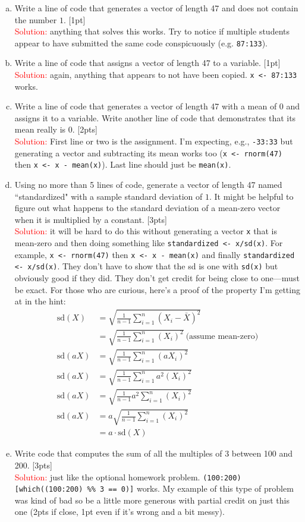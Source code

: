 \documentclass[12pt]{article}
\newcommand{\ans}{\\\textcolor{red}{Solution: }}
\begin{document}
\begin{enumerate}[(a)]
	\item Write a line of code that generates a vector of length 47 and does not contain the number $1$. [1pt] \ans anything that solves this works. Try to notice if multiple students appear to have submitted the same code conspicuously (e.g. \verb|87:133|).
	\item Write a line of code that assigns a vector of length 47 to a variable. [1pt] \ans{again, anything that appears to not have been copied. \verb|x <- 87:133| works.}
	\item Write a line of code that generates a vector of length 47 with a mean of $0$ and assigns it to a variable. Write another line of code that demonstrates that its mean really is $0$. [2pts] \ans First line or two is the assignment. I'm expecting, e.g., \verb|-33:33| but generating a vector and subtracting its mean works too (\verb|x <- rnorm(47)| then \verb|x <- x - mean(x)|). Last line should just be \verb|mean(x)|.
	\item Using no more than 5 lines of code, generate a vector of length 47 named ``standardized" with a sample standard deviation of $1$. It might be helpful to figure out what happens to the standard deviation of a mean-zero vector when it is multiplied by a constant. [3pts] \ans it will be hard to do this without generating a vector \verb|x| that is mean-zero and then doing something like \verb|standardized <- x/sd(x)|. For example, \verb|x <- rnorm(47)| then \verb|x <- x - mean(x)| and finally \verb|standardized <- x/sd(x)|. They don't have to show that the sd is one with \verb|sd(x)| but obviously good if they did. They don't get credit for being close to one---must be exact. For those who are curious, here's a proof of the property I'm getting at in the hint:
	\begin{align*}
	\text{sd}(X) &= \sqrt{\frac{1}{n-1}\sum_{i=1}^n (X_i - \bar{X})^2} \\
	&= \sqrt{\frac{1}{n-1}\sum_{i=1}^n (X_i)^2}~\text{(assume mean-zero)} \\
	\text{sd}(aX) &= \sqrt{\frac{1}{n-1}\sum_{i=1}^n (aX_i)^2} \\
	\text{sd}(aX) &= \sqrt{\frac{1}{n-1}\sum_{i=1}^n a^2(X_i)^2} \\
	\text{sd}(aX) &= \sqrt{\frac{1}{n-1}a^2\sum_{i=1}^n (X_i)^2} \\
	\text{sd}(aX) &= a\sqrt{\frac{1}{n-1}\sum_{i=1}^n (X_i)^2} \\
	&=a \cdot \text{sd}(X)
	\end{align*}
	\item Write code that computes the sum of all the multiples of $3$ between 100 and 200. [3pts] \ans just like the optional homework problem. \verb|(100:200)[which((100:200) %% 3 == 0)]| works. My example of this type of problem was kind of bad so be a little more generous with partial credit on just this one (2pts if close, 1pt even if it's wrong and a bit messy).
\end{enumerate}
\end{document}
